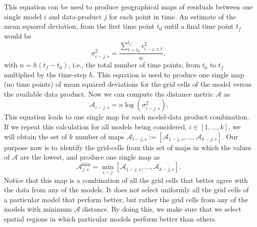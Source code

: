 \documentclass[gmd, manuscript]{copernicus}
\begin{document}
This equation can be used to produce geographical maps of residuals between one single model $i$ and data-product $j$ for each point in time. An estimate of the mean squared deviation, from the first time point $t_0$ until a final time point $t_f$ would be
\begin{equation}
\sigma_{i-j, s}^2 = \frac{ \sum_{t=t_0}^{t_f} \epsilon_{i-j, s, t}^2 }{n},
\end{equation}
with $n = h (t_f - t_0)$, i.e., the total number of time points, from $t_0$ to $t_f$ multiplied by the time-step $h$. This equation is used to produce one single map (no time points) of mean squared deviations for the grid cells of the model versus the available data product. Now we can compute  the distance metric $\mathcal{A}$ as
\begin{equation}
\mathcal{A}_{i-j, s} = n \log (\sigma_{i-j, s}^2).
\end{equation}
This equation leads to one single map for each model-data product combination. If we repeat this calculation for all models being considered, $i \in [1, \dots , k]$, we will obtain the set of $k$ number of maps $\mathcal{A}_{i-j, s} := [\mathcal{A}_{1-j, s}, \dots , \mathcal{A}_{k-j, s}] $. Our purpose now is to identify the grid-cells from this set of maps in which the values of $\mathcal{A}$ are the lowest, and produce one single map as
\begin{equation}
\mathcal{A}_{j, s}^{\min} = \min_{i-j} [\mathcal{A}_{1-j, s}, \dots , \mathcal{A}_{k-j, s}].
\end{equation}
Notice that this map is a combination of all the grid cells that better agree with the data from any of the models. It does not select uniformly all the grid cells of a particular model that perform better, but rather the grid cells from any of the models with minimum $\mathcal{A}$ distance. By doing this, we make sure that we select spatial regions in which particular models perform better than others.
\end{document}
